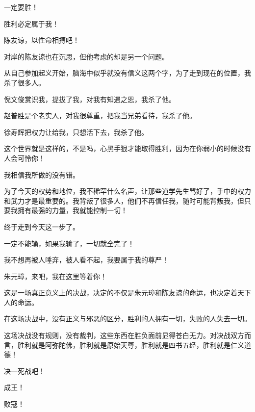 \begin{multicols}{\theparacolNo}
		一定要胜！

		胜利必定属于我！

		陈友谅，以性命相搏吧！

		对岸的陈友谅也在沉思，但他考虑的却是另一个问题。

		从自己参加起义开始，脑海中似乎就没有信义这两个字，为了走到现在的位置，我杀了很多人。

		倪文俊赏识我，提拔了我，对我有知遇之恩，我杀了他。

		赵普胜是个老实人，对我很尊重，把我当兄弟看待，我杀了他。

		徐寿辉把权力让给我，只想活下去，我杀了他。

		这个世界就是这样的，不是吗，心黑手狠才能取得胜利，因为在你弱小的时候没有人会可怜你！

		我相信我所做的没有错。

		为了今天的权势和地位，我不稀罕什么名声，让那些道学先生骂好了，手中的权力和武力才是最重要的。我背叛了很多人，他们不再信任我，随时可能背叛我，但只要我拥有最强的力量，我就能控制一切！

		终于走到今天这一步了。

		一定不能输，如果我输了，一切就全完了！

		我不想再被人唾弃，被人看不起，我要属于我的尊严！

		朱元璋，来吧，我在这里等着你！

		这是一场真正意义上的决战，决定的不仅是朱元璋和陈友谅的命运，也决定着天下人的命运。

		在这场决战中，没有正义与邪恶的区分，胜利的人拥有一切，失败的人失去一切。

		这场决战没有规则，没有裁判，这些东西在胜负面前显得苍白无力。对决战双方而言，胜利就是阿弥陀佛，胜利就是原始天尊，胜利就是四书五经，胜利就是仁义道德！

		决一死战吧！

		成王！

		败寇！
		\ifnum{}
	\end{multicols}
\fi
\newpage
